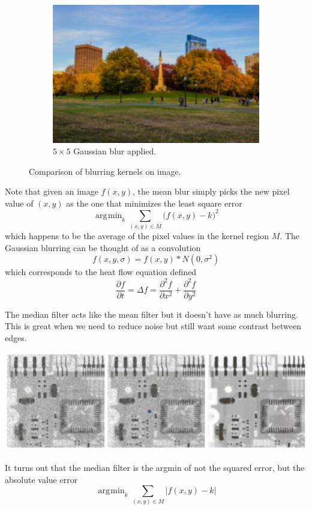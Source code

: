 \documentclass{article}
\DeclareMathOperator*{\argmin}{\arg\!\min}
\begin{document}
\begin{example}
\begin{figure}[H]
\begin{subfigure}[b]{0.32\textwidth}
      \centering
          \includegraphics[width=\textwidth]{img/Gaussian_Blur.png}
          \caption{$5 \times 5$ Gaussian blur applied. }
          \label{fig:gaussian_blur}
      \end{subfigure}
      
      \caption{Comparison of blurring kernels on image. }
      \label{fig:blur}
    \end{figure}
    \end{example}

    Note that given an image $f(x, y)$, the mean blur simply picks the new pixel value of $(x, y)$ as the one that minimizes the least square error 
    \[\argmin_k \sum_{(x, y) \in M} \big( f(x, y) - k \big)^2\]
    which happens to be the average of the pixel values in the kernel region $M$. The Gaussian blurring can be thought of as a convolution 
    \[f(x, y, \sigma) = f(x, y) \ast N(0, \sigma^2)\]
    which corresponds to the heat flow equation defined 
    \[\frac{\partial f}{\partial t} = \Delta f = \frac{\partial^2 f}{\partial x^2} + \frac{\partial^2 f}{\partial y^2}\]

    \begin{example}
    The median filter acts like the mean filter but it doesn't have as much blurring. This is great when we need to reduce noise but still want some contrast between edges. 
    \begin{center}
        \includegraphics[scale=0.25]{img/median_filter.png}
    \end{center}
    It turns out that the median filter is the argmin of not the squared error, but the absolute value error 
    \[\argmin_k \sum_{(x, y) \in M} \big| f(x, y) - k \big|\]
    \end{example}
\end{document}
